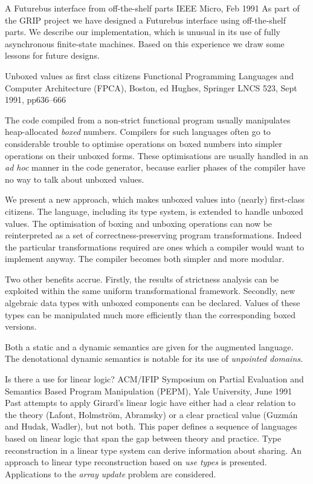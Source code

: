 {A Futurebus interface from off-the-shelf parts}
{IEEE Micro, Feb 1991}
{
As part of the GRIP project we have designed a Futurebus interface using
off-the-shelf parts.
We describe our implementation, which is unusual in its use of fully
asynchronous finite-state machines.
Based on this experience we draw some lessons for future designs.
}

{Unboxed values as first class citizens}
{Functional Programming Languages and Computer Architecture (FPCA), Boston,
ed Hughes, Springer LNCS 523, Sept 1991, pp636--666}
{The code compiled from a non-strict functional program usually
manipulates heap-allocated {\em boxed} numbers.
Compilers for such languages often go to considerable trouble to
optimise operations on boxed numbers into simpler operations
on their unboxed forms.  These optimisations are usually handled
in an {\em ad hoc} manner in 
the code generator, because earlier phases of the compiler have
no way to talk about unboxed values.

We present a new approach, which makes unboxed values into (nearly) first-class
citizens.  The language, including its type system, is extended to 
handle unboxed values.  The optimisation of boxing and unboxing operations
can now be reinterpreted as a set of correctness-preserving program
transformations.  Indeed the particular transformations 
required are ones which a compiler would want to implement anyway.
The compiler becomes both simpler and more modular.

Two other benefits accrue.  
Firstly, the results of strictness analysis can be exploited within
the same uniform transformational framework.
Secondly, new algebraic data types with
unboxed components can be declared.  Values of these types can be 
manipulated much more efficiently than the corresponding boxed versions.

Both a static and a dynamic semantics are given for the augmented language.
The denotational dynamic semantics is notable for its use of
{\em unpointed domains}.
}

{Is there a use for linear logic?}
{ACM/IFIP Symposium on Partial Evaluation
and Semantics Based Program Manipulation (PEPM), Yale
University, June 1991}
{
Past attempts to apply Girard's linear logic have either had a clear
relation to the theory (Lafont, Holmstr\"om, Abramsky) or a clear
practical value (Guzm\'an and Hudak, Wadler), but not both.  This paper
defines a sequence of languages based on linear logic that span the gap
between theory and practice.  Type reconstruction in a linear type
system can derive information about sharing.  An approach to linear type
reconstruction based on {\em use types\/} is presented.  Applications
to the {\em array update\/} problem are considered.
}

